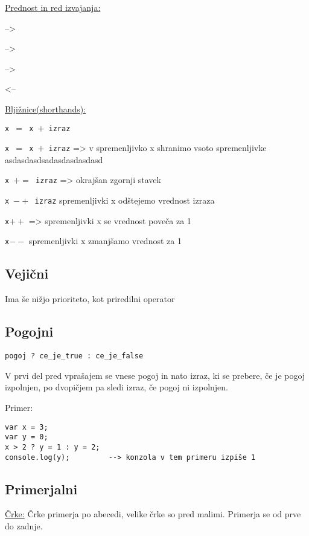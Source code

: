 \underline{Prednost in red izvajanja:}\

\begin{description}[align=left,labelwidth=3cm]
	\item [Aritmetični] --> 
	\item [Primerjalni] -->
	\item [Logični] -->
	\item [Priredilni] <--
\end{description}

\underline{Bljižnice(shorthands):}\

\begin{labeling}{\texttt{x $=$ x $+$ izraz}}
	\item [\texttt{x $=$ x $+$ izraz}] => v spremenljivko x shranimo vsoto spremenljivke asdasdasdsadasdasdasdasd
	\item [\texttt{x $+=$ izraz}] => okrajšan zgornji stavek
	\item[\texttt{x $-+$ izraz}] spremenljivki x odštejemo vrednost izraza
	\item [\texttt{x$++$}] => spremenljivki x se vrednost poveča za 1
	\item[\texttt{x$--$}] spremenljivki x zmanjšamo vrednost za 1
\end{labeling}

\subsection{Vejični}

Ima še nižjo prioriteto, kot priredilni operator

\subsection{Pogojni}
\texttt{pogoj ? ce\_je\_true : ce\_je\_false}

V prvi del pred vprašajem se vnese pogoj in nato izraz, ki se prebere, če je pogoj izpolnjen, po dvopičjem pa sledi izraz, če pogoj ni izpolnjen.

Primer:\begin{verbatim}
var x = 3;
var y = 0;
x > 2 ? y = 1 : y = 2;
console.log(y);			--> konzola v tem primeru izpiše 1
\end{verbatim}

\subsection{Primerjalni}
\underline{Črke:}
Črke primerja po abecedi, velike črke so pred malimi. Primerja se od prve do zadnje.

